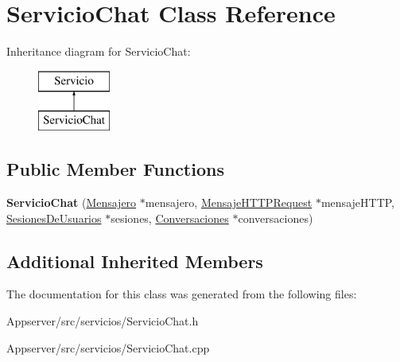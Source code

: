 \hypertarget{classServicioChat}{}\section{Servicio\+Chat Class Reference}
\label{classServicioChat}
Inheritance diagram for Servicio\+Chat\+:\begin{figure}[H]
\begin{center}
\leavevmode
\includegraphics[height=2.000000cm]{classServicioChat}
\end{center}
\end{figure}
\subsection*{Public Member Functions}
\begin{DoxyCompactItemize}
\item 
{\bfseries Servicio\+Chat} (\hyperlink{classMensajero}{Mensajero} $\ast$mensajero, \hyperlink{classMensajeHTTPRequest}{Mensaje\+H\+T\+T\+P\+Request} $\ast$mensaje\+H\+T\+TP, \hyperlink{classSesionesDeUsuarios}{Sesiones\+De\+Usuarios} $\ast$sesiones, \hyperlink{classConversaciones}{Conversaciones} $\ast$conversaciones)\hypertarget{classServicioChat_a13e56b41c86b87501d4f242581a710cb}{}\label{classServicioChat_a13e56b41c86b87501d4f242581a710cb}

\end{DoxyCompactItemize}
\subsection*{Additional Inherited Members}


The documentation for this class was generated from the following files\+:\begin{DoxyCompactItemize}
\item 
Appserver/src/servicios/Servicio\+Chat.\+h\item 
Appserver/src/servicios/Servicio\+Chat.\+cpp\end{DoxyCompactItemize}
